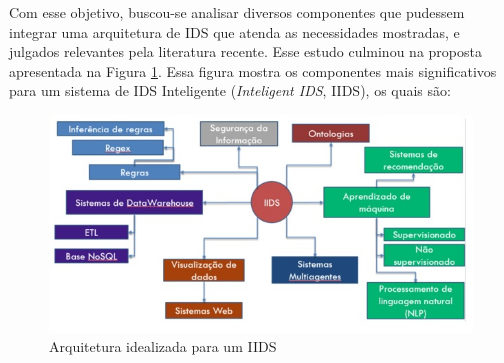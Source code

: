 \documentclass[
	12pt,				%
	openright,			%
	twoside,			%
	a4paper,			%
	english,			%
	french,				%
	spanish,			%
	brazil,				%
	]{abntex2}
\begin{document}
Com esse objetivo, buscou-se analisar diversos componentes que pudessem integrar uma arquitetura de IDS que atenda as necessidades mostradas, e julgados relevantes pela literatura recente. Esse estudo culminou na proposta apresentada na Figura \ref{fig:arquitetura-iids}. Essa figura mostra os componentes mais significativos para um sistema de IDS Inteligente (\emph{Inteligent IDS}, IIDS), os quais são:

\begin{figure}[ht]
	\centering
	\includegraphics[width=.8\textwidth]{arquitetura-iids.jpg}
	\caption{Arquitetura idealizada para um IIDS}
	\label{fig:arquitetura-iids}
\end{figure}
\end{document}
